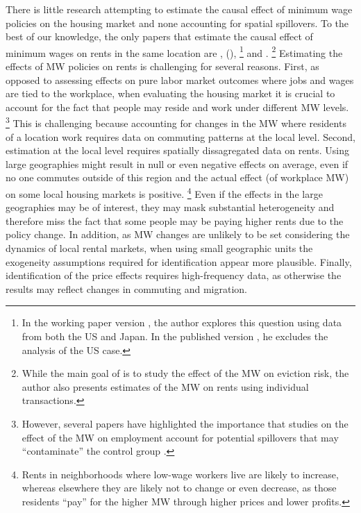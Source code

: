 
There is little research attempting to estimate the causal effect of minimum 
wage policies on the housing market and none accounting for spatial spillovers.
To the best of our knowledge, the only papers that estimate the causal effect of 
minimum wages on rents in the same location are \textcite{Tidemann2018}, 
\citeauthor{Yamagishi2019} (\citeyear{Yamagishi2019, Yamagishi2021}),%
\footnote{In the working paper version \parencite{Yamagishi2019}, the author 
explores this question using data from both the US and Japan.
In the published version \parencite{Yamagishi2021}, he excludes the analysis of 
the US case.}
and \textcite{AgarwalEtAl2021}.%
\footnote{While the main goal of \textcite{AgarwalEtAl2021} is to study the 
effect of the MW on eviction risk, the author also presents estimates of the
MW on rents using individual transactions.}
Estimating the effects of MW policies on rents is challenging for several 
reasons. 
First, as opposed to assessing effects on pure labor market outcomes where jobs 
and wages are tied to the workplace, when evaluating the housing market it is 
crucial to account for the fact that people may reside and work under different 
MW levels.%
\footnote{However, several papers have highlighted the importance that studies
on the effect of the MW on employment account for potential spillovers that may
``contaminate'' the control group \parencite{Kuehn2016, Huang2020}.}
This is challenging because accounting for changes in the MW where residents
of a location work requires data on commuting patterns at the local level.
Second, estimation at the local level requires spatially dissagregated data on 
rents.
Using large geographies might result in null or even negative effects on average,
even if no one commutes outside of this region and the actual effect (of 
workplace MW) on some local housing markets is positive.%
\footnote{Rents in neighborhoods where low-wage workers live are likely to 
increase, whereas elsewhere they are likely not to change or even decrease, 
as those residents ``pay'' for the higher MW through higher prices and lower 
profits.}
Even if the effects in the large geographies may be of interest, they may mask 
substantial heterogeneity and therefore miss the fact that some people may be 
paying higher rents due to the policy change.
In addition, as MW changes are unlikely to be set considering the dynamics of 
local rental markets, when using small geographic units the exogeneity assumptions 
required for identification appear more plausible.
Finally, identification of the price effects requires high-frequency data, 
as otherwise the results may reflect changes in commuting and migration.


